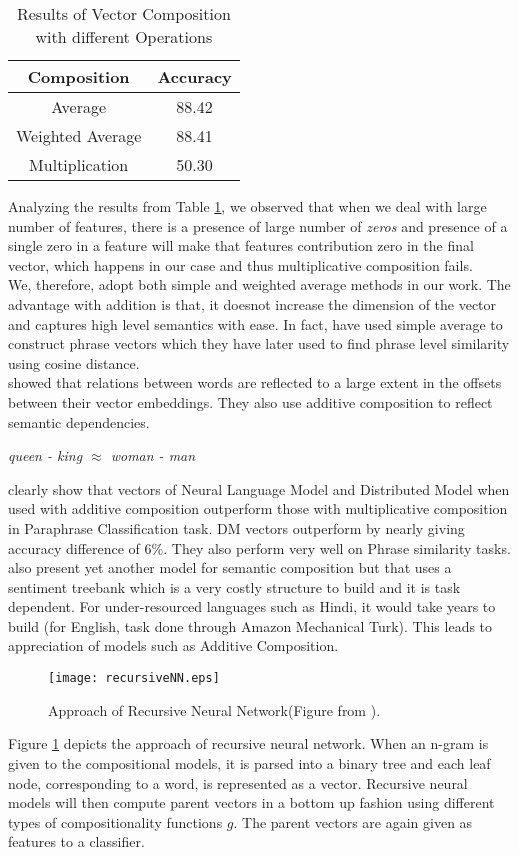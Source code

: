 \begin {table}[h!]
\centering
\begin{tabular}{ |c|c| }
\hline
Composition & Accuracy \\ \hline \hline
Average & 88.42 \\ \hline
Weighted Average & 88.41 \\ \hline
Multiplication & 50.30 \\ \hline
\end{tabular}
\caption {Results of Vector Composition with different Operations}
\label{table:composition}
\end{table}
Analyzing the results from Table \ref{table:composition}, we observed that when we deal with large number of features, there is a presence of large number of \emph{zeros} and presence of a single zero in a feature will make that features contribution zero in the final vector, which happens in our case and thus multiplicative composition fails.\\
We, therefore, adopt both simple and weighted average methods in our work. The advantage with addition is that, it doesnot increase the dimension of the vector and captures high level semantics with ease. In fact, \cite{Zou:13} have used simple average to construct phrase vectors which they have later used to find phrase level similarity using cosine distance.\\
\cite{Mikolov:13c} showed that relations between words are reflected to a large extent in the offsets between their vector embeddings. They also use additive composition to reflect semantic dependencies.
\begin{center}
\emph{queen - king $\approx$ woman - man}
\end{center}
\cite{Blacoe:12} clearly show that vectors of Neural Language Model and Distributed Model when used with additive composition outperform those with multiplicative composition in Paraphrase Classification task. DM vectors outperform by nearly giving accuracy difference of 6\%. They also perform very well on Phrase similarity tasks.\\
\cite{Socher:13} also present yet another model for semantic composition but that uses a sentiment treebank which is a very costly structure to build and it is task dependent. For under-resourced languages such as Hindi, it would take years to build (for English, task done through Amazon Mechanical Turk). This leads to appreciation of models such as Additive Composition.\\
\begin{figure}[ht!]
\centering
\texttt{[image: recursiveNN.eps]}
\caption{Approach of Recursive Neural Network(Figure from \cite{Socher:13}). \label{fig:recursiveNN}}
\end{figure}
Figure \ref{fig:recursiveNN} depicts the approach of recursive neural network. When an n-gram is given to the compositional models, it is parsed into a binary tree and each leaf node, corresponding to a word, is represented as a vector. Recursive neural models will then  compute parent vectors in a bottom up fashion using different types of compositionality functions $g$. The parent vectors are again given as features to a classifier.

